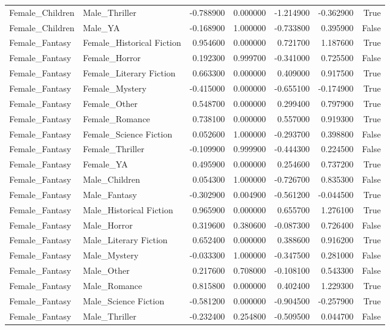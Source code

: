 \begin{tabular}{llrrrrr}
Female_Children & Male_Thriller & -0.788900 & 0.000000 & -1.214900 & -0.362900 & True \\
Female_Children & Male_YA & -0.168900 & 1.000000 & -0.733800 & 0.395900 & False \\
Female_Fantasy & Female_Historical Fiction & 0.954600 & 0.000000 & 0.721700 & 1.187600 & True \\
Female_Fantasy & Female_Horror & 0.192300 & 0.999700 & -0.341000 & 0.725500 & False \\
Female_Fantasy & Female_Literary Fiction & 0.663300 & 0.000000 & 0.409000 & 0.917500 & True \\
Female_Fantasy & Female_Mystery & -0.415000 & 0.000000 & -0.655100 & -0.174900 & True \\
Female_Fantasy & Female_Other & 0.548700 & 0.000000 & 0.299400 & 0.797900 & True \\
Female_Fantasy & Female_Romance & 0.738100 & 0.000000 & 0.557000 & 0.919300 & True \\
Female_Fantasy & Female_Science Fiction & 0.052600 & 1.000000 & -0.293700 & 0.398800 & False \\
Female_Fantasy & Female_Thriller & -0.109900 & 0.999900 & -0.444300 & 0.224500 & False \\
Female_Fantasy & Female_YA & 0.495900 & 0.000000 & 0.254600 & 0.737200 & True \\
Female_Fantasy & Male_Children & 0.054300 & 1.000000 & -0.726700 & 0.835300 & False \\
Female_Fantasy & Male_Fantasy & -0.302900 & 0.004900 & -0.561200 & -0.044500 & True \\
Female_Fantasy & Male_Historical Fiction & 0.965900 & 0.000000 & 0.655700 & 1.276100 & True \\
Female_Fantasy & Male_Horror & 0.319600 & 0.380600 & -0.087300 & 0.726400 & False \\
Female_Fantasy & Male_Literary Fiction & 0.652400 & 0.000000 & 0.388600 & 0.916200 & True \\
Female_Fantasy & Male_Mystery & -0.033300 & 1.000000 & -0.347500 & 0.281000 & False \\
Female_Fantasy & Male_Other & 0.217600 & 0.708000 & -0.108100 & 0.543300 & False \\
Female_Fantasy & Male_Romance & 0.815800 & 0.000000 & 0.402400 & 1.229300 & True \\
Female_Fantasy & Male_Science Fiction & -0.581200 & 0.000000 & -0.904500 & -0.257900 & True \\
Female_Fantasy & Male_Thriller & -0.232400 & 0.254800 & -0.509500 & 0.044700 & False \\

\end{tabular}
